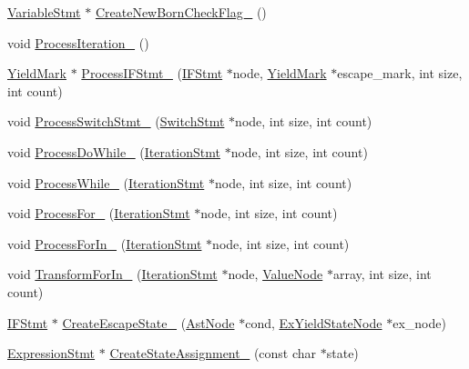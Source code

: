 \begin{DoxyCompactItemize}
\item 
\hyperlink{classmocha_1_1_variable_stmt}{VariableStmt} $\ast$ \hyperlink{classmocha_1_1_yield_helper_a697c8672acf020bb61057d2aea4c897c}{CreateNewBornCheckFlag\_\-} ()
\item 
void \hyperlink{classmocha_1_1_yield_helper_a48f22e4eaf29ae29cd9dcce2e261cc8f}{ProcessIteration\_\-} ()
\item 
\hyperlink{classmocha_1_1_yield_mark}{YieldMark} $\ast$ \hyperlink{classmocha_1_1_yield_helper_ac2e2a4c17c61c086292475f7b8592225}{ProcessIFStmt\_\-} (\hyperlink{classmocha_1_1_i_f_stmt}{IFStmt} $\ast$node, \hyperlink{classmocha_1_1_yield_mark}{YieldMark} $\ast$escape\_\-mark, int size, int count)
\item 
void \hyperlink{classmocha_1_1_yield_helper_a7e6dd3e147975fad9bb444c33b05f352}{ProcessSwitchStmt\_\-} (\hyperlink{classmocha_1_1_switch_stmt}{SwitchStmt} $\ast$node, int size, int count)
\item 
void \hyperlink{classmocha_1_1_yield_helper_a74cb52ca376b507a0c2610ab4bfd02fe}{ProcessDoWhile\_\-} (\hyperlink{classmocha_1_1_iteration_stmt}{IterationStmt} $\ast$node, int size, int count)
\item 
void \hyperlink{classmocha_1_1_yield_helper_ab87a9b05de0aaac43f1c427561998dea}{ProcessWhile\_\-} (\hyperlink{classmocha_1_1_iteration_stmt}{IterationStmt} $\ast$node, int size, int count)
\item 
void \hyperlink{classmocha_1_1_yield_helper_adf0654d520b27e8782b8f19449c375c1}{ProcessFor\_\-} (\hyperlink{classmocha_1_1_iteration_stmt}{IterationStmt} $\ast$node, int size, int count)
\item 
void \hyperlink{classmocha_1_1_yield_helper_a6c8f6f6f80e054e0c013deb34adc3542}{ProcessForIn\_\-} (\hyperlink{classmocha_1_1_iteration_stmt}{IterationStmt} $\ast$node, int size, int count)
\item 
void \hyperlink{classmocha_1_1_yield_helper_ab62b0c4308b3713d9c8ea4eb5879c254}{TransformForIn\_\-} (\hyperlink{classmocha_1_1_iteration_stmt}{IterationStmt} $\ast$node, \hyperlink{classmocha_1_1_value_node}{ValueNode} $\ast$array, int size, int count)
\item 
\hyperlink{classmocha_1_1_i_f_stmt}{IFStmt} $\ast$ \hyperlink{classmocha_1_1_yield_helper_a5f15b9efd0c719c130741ff709acf0bd}{CreateEscapeState\_\-} (\hyperlink{classmocha_1_1_ast_node}{AstNode} $\ast$cond, \hyperlink{classmocha_1_1_ex_yield_state_node}{ExYieldStateNode} $\ast$ex\_\-node)
\item 
\hyperlink{classmocha_1_1_expression_stmt}{ExpressionStmt} $\ast$ \hyperlink{classmocha_1_1_yield_helper_afd7cf92255befe3d3fe47c7f8a904ea0}{CreateStateAssignment\_\-} (const char $\ast$state)

\end{DoxyCompactItemize}

